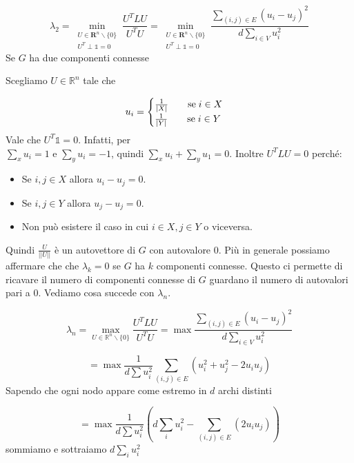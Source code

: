 \documentclass[12pt]{report}
\begin{document}
$$\lambda_2 = \min_{\substack{U \in \mathbf{R}^n \backslash \{0\} \\ U^T \perp \mathds{1} = 0 }} \frac{U^T L U}{U^T U} = \min_{\substack{U \in \mathbf{R}^n \backslash \{0\} \\ U^T \perp \mathds{1} = 0 }} \frac{\sum_{(i,j) \in E} (u_i - u_j)^2}{d \sum_{i \in V} u_i^2}$$
Se $G$ ha due componenti connesse


 \noindent 
 Scegliamo  $U \in \mathbb{R}^n$ tale che 

$$u_i = \begin{cases}
    \frac{1}{|X|} \hspace{20px} \text{se}\; i \in X \\
    \frac{1}{|Y|} \hspace{20px} \text{se}\; i \in Y 
\end{cases}$$
Vale che $U^T \mathds{1} = 0$. Infatti, per  \\ $\sum_x u_i = 1$ e $\sum_y u_i = -1$, quindi $\sum_x u_i + \sum_y u_1 = 0$. Inoltre $U^T L U = 0$ perché:

\begin{itemize}
    \item Se $i,j \in X$ allora $u_i - u_j = 0$.
    \item Se $i,j \in Y$ allora $u_j - u_j = 0$.
    \item Non può esistere il caso in cui $i \in X, j \in Y$ o viceversa.
\end{itemize}

\noindent
Quindi $\frac{U}{||U||}$ è un autovettore di $G$ con autovalore $0$. Più in generale possiamo affermare che che $\lambda_k = 0$ se $G$ ha $k$ componenti connesse. Questo ci permette di ricavare il numero di componenti connesse di $G$ guardano il numero di autovalori pari a $0$.
Vediamo cosa succede con $\lambda_n$. 

$$\lambda_n = \max_{U \in \mathbb{R}^n \backslash \{0\}} \frac{U^T L U }{U^T U} = \max \frac{\sum_{(i,j) \in E} (u_i - u_j)^2}{d \sum_{i \in V} u_i^2}$$

$$= \max \frac{1}{d \sum u_i^2} \sum_{(i,j) \in E} (u_i^2 + u_j^2 - 2u_iu_j)$$
Sapendo che ogni nodo appare come estremo in $d$ archi distinti

$$= \max \frac{1}{d \sum u_i^2} (d \sum_i u_i^2 -  \sum_{(i,j) \in E} (2u_iu_j
)) $$
sommiamo e sottraiamo $d \sum_i u_i^2$
\end{document}
